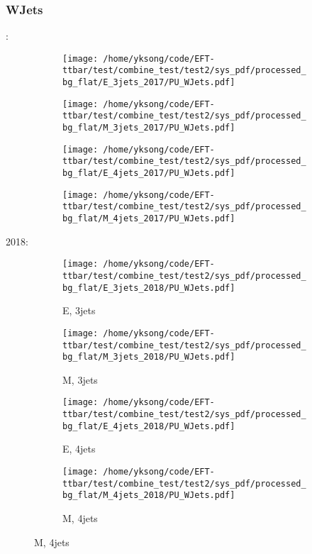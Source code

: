 \documentclass{beamer}
\begin{document}
\begin{frame}
\frametitle{WJets}
\fontsize{5}{1}:
\begin{figure}
\centering
\begin{subfigure}[b]{0.24\textwidth}
\texttt{[image: /home/yksong/code/EFT-ttbar/test/combine\_test/test2/sys\_pdf/processed\_bg\_flat/E\_3jets\_2017/PU\_WJets.pdf]}
\end{subfigure}
\begin{subfigure}[b]{0.24\textwidth}
\texttt{[image: /home/yksong/code/EFT-ttbar/test/combine\_test/test2/sys\_pdf/processed\_bg\_flat/M\_3jets\_2017/PU\_WJets.pdf]}
\end{subfigure}
\begin{subfigure}[b]{0.24\textwidth}
\texttt{[image: /home/yksong/code/EFT-ttbar/test/combine\_test/test2/sys\_pdf/processed\_bg\_flat/E\_4jets\_2017/PU\_WJets.pdf]}
\end{subfigure}
\begin{subfigure}[b]{0.24\textwidth}
\texttt{[image: /home/yksong/code/EFT-ttbar/test/combine\_test/test2/sys\_pdf/processed\_bg\_flat/M\_4jets\_2017/PU\_WJets.pdf]}
\end{subfigure}
\end{figure}
2018:
\begin{figure}
\centering
\begin{subfigure}[b]{0.24\textwidth}
\texttt{[image: /home/yksong/code/EFT-ttbar/test/combine\_test/test2/sys\_pdf/processed\_bg\_flat/E\_3jets\_2018/PU\_WJets.pdf]}
\captionsetup{font=tiny}
\caption{E, 3jets}
\end{subfigure}
\begin{subfigure}[b]{0.24\textwidth}
\texttt{[image: /home/yksong/code/EFT-ttbar/test/combine\_test/test2/sys\_pdf/processed\_bg\_flat/M\_3jets\_2018/PU\_WJets.pdf]}
\captionsetup{font=tiny}
\caption{M, 3jets}
\end{subfigure}
\begin{subfigure}[b]{0.24\textwidth}
\texttt{[image: /home/yksong/code/EFT-ttbar/test/combine\_test/test2/sys\_pdf/processed\_bg\_flat/E\_4jets\_2018/PU\_WJets.pdf]}
\captionsetup{font=tiny}
\caption{E, 4jets}
\end{subfigure}
\begin{subfigure}[b]{0.24\textwidth}
\texttt{[image: /home/yksong/code/EFT-ttbar/test/combine\_test/test2/sys\_pdf/processed\_bg\_flat/M\_4jets\_2018/PU\_WJets.pdf]}
\captionsetup{font=tiny}
\caption{M, 4jets}
\end{subfigure}
\end{figure}
\end{frame}
\end{document}
